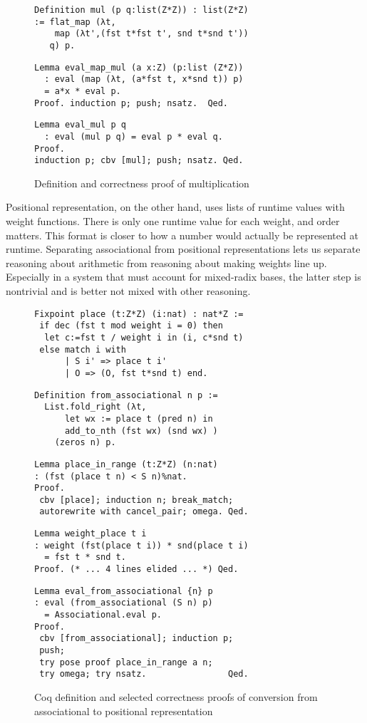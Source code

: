 \documentclass[conference,letterpaper]{IEEEtran}
\begin{document}
\begin{figure}
  \begin{verbatim}
Definition mul (p q:list(Z*Z)) : list(Z*Z)
:= flat_map (λt,
    map (λt',(fst t*fst t', snd t*snd t'))
   q) p.
	\end{verbatim}
  \begin{verbatim}
Lemma eval_map_mul (a x:Z) (p:list (Z*Z))
  : eval (map (λt, (a*fst t, x*snd t)) p)
  = a*x * eval p.
Proof. induction p; push; nsatz.  Qed.
	\end{verbatim}
  \begin{verbatim}
Lemma eval_mul p q
  : eval (mul p q) = eval p * eval q.
Proof.
induction p; cbv [mul]; push; nsatz. Qed.
\end{verbatim}
  \caption{\label{assocmul}Definition and correctness proof of multiplication}
\end{figure}

Positional representation, on the other hand, uses lists of runtime values with weight functions.
There is only one runtime value for each weight, and order matters.
This format is closer to how a number would actually be represented at runtime.
Separating associational from positional representations lets us separate reasoning about arithmetic from reasoning about making weights line up.
Especially in a system that must account for mixed-radix bases, the latter step is nontrivial and is better not mixed with other reasoning.

\begin{figure}
  \begin{verbatim}
Fixpoint place (t:Z*Z) (i:nat) : nat*Z :=
 if dec (fst t mod weight i = 0) then
  let c:=fst t / weight i in (i, c*snd t)
 else match i with
      | S i' => place t i'
      | O => (O, fst t*snd t) end.
	\end{verbatim}
  \begin{verbatim}
Definition from_associational n p :=
  List.fold_right (λt,
      let wx := place t (pred n) in
      add_to_nth (fst wx) (snd wx) )
    (zeros n) p.
	\end{verbatim}
  \begin{verbatim}
Lemma place_in_range (t:Z*Z) (n:nat)
: (fst (place t n) < S n)%nat.
Proof.
 cbv [place]; induction n; break_match;
 autorewrite with cancel_pair; omega. Qed.
	\end{verbatim}
  \begin{verbatim}
Lemma weight_place t i
: weight (fst(place t i)) * snd(place t i)
  = fst t * snd t.
Proof. (* ... 4 lines elided ... *) Qed.
	\end{verbatim}
  \begin{verbatim}
Lemma eval_from_associational {n} p
: eval (from_associational (S n) p)
  = Associational.eval p.
Proof.
 cbv [from_associational]; induction p;
 push;
 try pose proof place_in_range a n;
 try omega; try nsatz.                Qed.
 \end{verbatim}
  \caption{\label{fromassoc}Coq definition and selected correctness proofs of conversion from associational to positional representation}
\end{figure}
\end{document}
